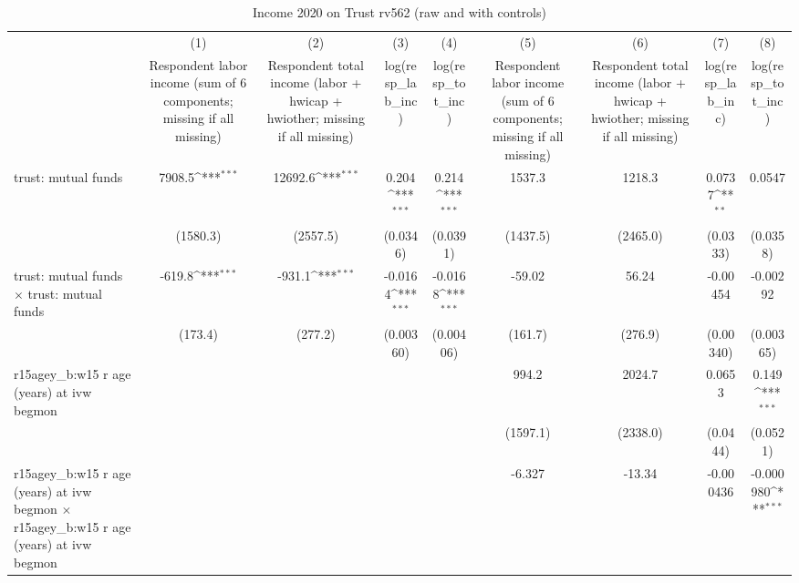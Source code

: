 \begin{table}[htbp]\centering
\def\sym#1{\ifmmode^{#1}\else\(^{#1}\)\fi}
\caption{Income 2020 on Trust rv562 (raw and with controls)}
\begin{tabular}{l*{8}{c}}
\toprule
                &\multicolumn{1}{c}{(1)}&\multicolumn{1}{c}{(2)}&\multicolumn{1}{c}{(3)}&\multicolumn{1}{c}{(4)}&\multicolumn{1}{c}{(5)}&\multicolumn{1}{c}{(6)}&\multicolumn{1}{c}{(7)}&\multicolumn{1}{c}{(8)}\\
                &\multicolumn{1}{c}{Respondent labor income (sum of 6 components; missing if all missing)}&\multicolumn{1}{c}{Respondent total income (labor + hwicap + hwiother; missing if all missing)}&\multicolumn{1}{c}{log(resp\_lab\_inc)}&\multicolumn{1}{c}{log(resp\_tot\_inc)}&\multicolumn{1}{c}{Respondent labor income (sum of 6 components; missing if all missing)}&\multicolumn{1}{c}{Respondent total income (labor + hwicap + hwiother; missing if all missing)}&\multicolumn{1}{c}{log(resp\_lab\_inc)}&\multicolumn{1}{c}{log(resp\_tot\_inc)}\\
\midrule
trust: mutual funds&   7908.5\sym{***}&  12692.6\sym{***}&    0.204\sym{***}&    0.214\sym{***}&   1537.3         &   1218.3         &   0.0737\sym{**} &   0.0547         \\
                & (1580.3)         & (2557.5)         & (0.0346)         & (0.0391)         & (1437.5)         & (2465.0)         & (0.0333)         & (0.0358)         \\
\addlinespace
trust: mutual funds $\times$ trust: mutual funds&   -619.8\sym{***}&   -931.1\sym{***}&  -0.0164\sym{***}&  -0.0168\sym{***}&   -59.02         &    56.24         & -0.00454         & -0.00292         \\
                &  (173.4)         &  (277.2)         &(0.00360)         &(0.00406)         &  (161.7)         &  (276.9)         &(0.00340)         &(0.00365)         \\
\addlinespace
r15agey\_b:w15 r age (years) at ivw begmon&                  &                  &                  &                  &    994.2         &   2024.7         &   0.0653         &    0.149\sym{***}\\
                &                  &                  &                  &                  & (1597.1)         & (2338.0)         & (0.0444)         & (0.0521)         \\
\addlinespace
r15agey\_b:w15 r age (years) at ivw begmon $\times$ r15agey\_b:w15 r age (years) at ivw begmon&                  &                  &                  &                  &   -6.327         &   -13.34         &-0.000436         &-0.000980\sym{***}\\

\end{tabular}
\end{table}
